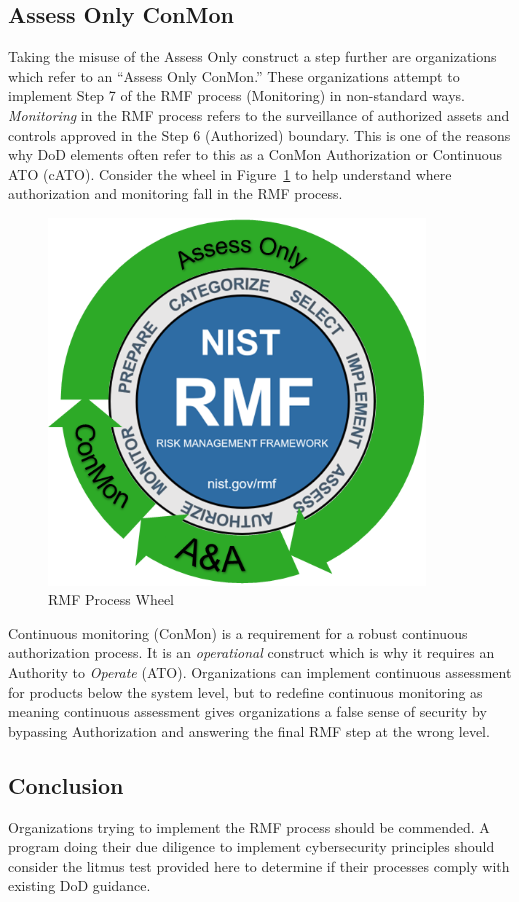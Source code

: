 \subsection{Assess Only ConMon}
Taking the misuse of the Assess Only construct a step further are organizations which refer to an ``Assess Only ConMon.'' These organizations attempt to implement Step 7 of the RMF process (Monitoring) in non-standard ways. \textit{Monitoring} in the RMF process refers to the surveillance of authorized assets and controls approved in the Step 6 (Authorized) boundary.\autocite{20240212:nist80037rev2} This is one of the reasons why DoD elements often refer to this as a ConMon Authorization or Continuous ATO (cATO). Consider the wheel in Figure~\ref{fig:20240212:rmfwheel} to help understand where authorization and monitoring fall in the RMF process.

\begin{figure}[h]
\centering
\includegraphics[width=10cm, height=9.73cm]{20240212.rmfwheel.png}
\caption{RMF Process Wheel}
\label{fig:20240212:rmfwheel}
\end{figure}

Continuous monitoring (ConMon) is a requirement for a robust continuous authorization process. It is an \textit{operational} construct which is why it requires an Authority to \textit{Operate} (ATO). Organizations can implement continuous assessment for products below the system level, but to redefine continuous monitoring as meaning continuous assessment gives organizations a false sense of security by bypassing Authorization and answering the final RMF step at the wrong level.

\subsection{Conclusion}
Organizations trying to implement the RMF process should be commended. A program doing their due diligence to implement cybersecurity principles should consider the litmus test provided here to determine if their processes comply with existing DoD guidance.
